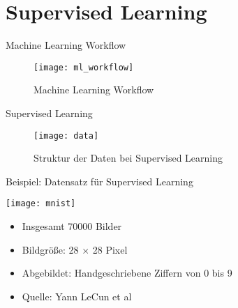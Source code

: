 \section{Supervised Learning}%
\label{sec:supervised}

\begin{frame}{Machine Learning Workflow}
  \begin{figure}[!htbp]
    \centering
    \texttt{[image: ml\_workflow]}
    \caption{Machine Learning Workflow \parencite{geron2019hands}}%
    \label{fig:workflow}
  \end{figure}
\end{frame}

\begin{frame}{Supervised Learning}
  \begin{figure}[!htbp]
    \centering
    \texttt{[image: data]}
    \caption{Struktur der Daten bei Supervised Learning \parencite{geron2019hands}}%
    \label{fig:data}
  \end{figure}

\end{frame}

\begin{frame}{Beispiel: Datensatz für Supervised Learning}
  \begin{minipage}{.6\textwidth}
    \centering
    \texttt{[image: mnist]}
  \end{minipage}\hfill%
  \begin{minipage}{.4\textwidth}
    \begin{itemize}
    \item Insgesamt 70000 Bilder
    \item Bildgröße: 28 \(\times\) 28 Pixel
    \item Abgebildet: Handgeschriebene Ziffern von 0 bis 9
    \item Quelle: Yann LeCun et al \parencite{lecun1998gradient}
    \end{itemize}
  \end{minipage}
\end{frame}

